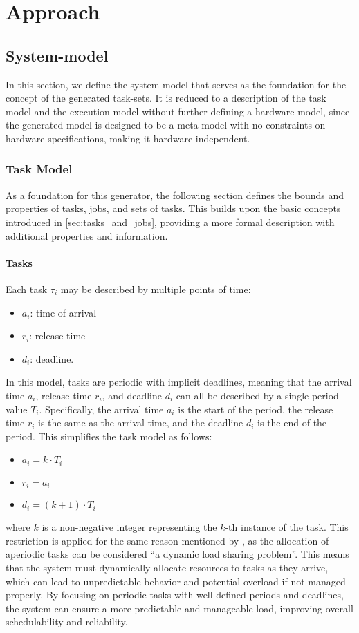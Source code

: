 \chapter{Approach}
\section{System-model}\label{sec:model}
In this section, we define the system model that serves as the foundation for the concept of the generated task-sets.
It is reduced to a description of the task model and the execution model without further defining a hardware model, since the generated model is designed to be a meta model with no constraints on hardware specifications, making it hardware independent.

\subsection{Task Model}\label{sec:task_model}
As a foundation for this generator, the following section defines the bounds and properties of tasks, jobs, and sets of tasks. This builds upon the basic concepts introduced in \cref{sec:tasks_and_jobs}, providing a more formal description with additional properties and information.

\subsubsection{Tasks}\label{sec:task}
Each task $\tau_i$ may be described by multiple points of time:
\begin{itemize}
    \item $a_i$: time of arrival
    \item $r_i$: release time
    \item $d_i$: deadline.
\end{itemize}
In this model, tasks are periodic with implicit deadlines, meaning that the arrival time $a_i$, release time $r_i$, and deadline $d_i$ can all be described by a single period value $T_i$. 
Specifically, the arrival time $a_i$ is the start of the period, the release time $r_i$ is the same as the arrival time, and the deadline $d_i$ is the end of the period. 
This simplifies the task model as follows:
\begin{itemize}
	\item $a_i = k \cdot T_i$
	\item $r_i = a_i$
	\item $d_i = (k + 1) \cdot T_i$
\end{itemize}
where $k$ is a non-negative integer representing the $k$-th instance of the task.
This restriction is applied for the same reason mentioned by \textcite{dar-tzenpengAssignmentSchedulingCommunicating1997}, as the allocation of aperiodic tasks can be considered ``a dynamic load sharing problem''\cite{dar-tzenpengAssignmentSchedulingCommunicating1997}. 
This means that the system must dynamically allocate resources to tasks as they arrive, which can lead to unpredictable behavior and potential overload if not managed properly. 
By focusing on periodic tasks with well-defined periods and deadlines, the system can ensure a more predictable and manageable load, improving overall schedulability and reliability.

